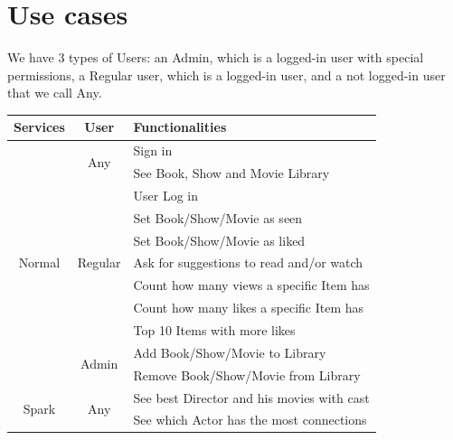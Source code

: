 \documentclass{article}
\newcommand*\fpar{\hspace{1ex}}
\begin{document}
\clearpage
\section{Use cases}
\label{sec:cases}
\fpar We have 3 types of Users: an Admin, which is a logged-in user with special permissions, a Regular user, which is a logged-in user, and a not logged-in user that we call Any.
\begin{table}[H]
  \centering
  \begin{tabular}{c|c|l} 
    Services & User & Functionalities \\ \hline
    \multirow{11}{*}{ Normal }
      & \multirow{2}{*}{ Any } 
        & Sign in \\
      & & See Book, Show and Movie Library \\ \cline{2-3}
      & \multirow{7}{*}{ Regular } 
        & User Log in \\
      & & Set Book/Show/Movie as seen \\
      & & Set Book/Show/Movie as liked \\ 
      & & Ask for suggestions to read and/or watch \\ 
      & & Count how many views a specific Item has \\
      & & Count how many likes a specific Item has \\
      & & Top 10 Items with more likes \\ \cline{2-3}
    & \multirow{2}{*}{ Admin } 
        & Add Book/Show/Movie to Library \\
      & & Remove Book/Show/Movie from Library \\ \hline
    \multirow{2}{*}{ Spark }
      & \multirow{2}{*}{ Any }
        & See best Director and his movies with cast \\
      & & See which Actor has the most connections \\
  \end{tabular}
\end{table}
\end{document}

